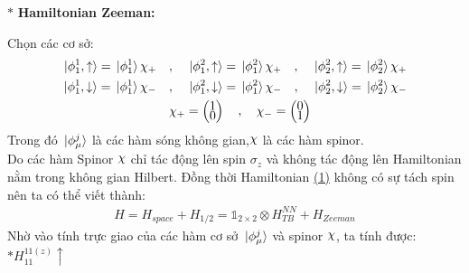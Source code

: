 \documentclass{report}
\DeclareRobustCommand{\rchi}{{\mathpalette\irchi\relax}}
\newcommand{\irchi}[2]{\raisebox{\depth}{$#1\chi$}}
\begin{document}
\clearpage

\noindent $\ast$ \textbf{Hamiltonian Zeeman:}

Chọn các cơ sở:
\begin{align*}
	\ket*{\phi^1_1 ,\uparrow}    = \ket*{\phi^1_1}\chi_{+}\quad & ,\quad \ket*{\phi^2_1 ,\uparrow} = \ket*{\phi^2_1}\chi_+ \quad,\quad \ket*{\phi^2_2 ,\uparrow} = \ket*{\phi^2_2}\chi_+         \\
	\ket*{\phi^1_1 ,\downarrow}  =	\ket*{\phi^1_1 }\chi_- \quad  & , \quad 	\ket*{\phi^2_1 ,\downarrow} = \ket*{\phi^2_1 }\chi_- \quad, \quad \ket*{\phi^2_2 ,\downarrow} = \ket*{\phi^2_2 }\chi_- \\
	                                                            & \chi_{+} = \begin{pmatrix}
		                                                                         \renewcommand{\arraystretch}{0.4}
		                                                                         1 \\
		                                                                         0
	                                                                         \end{pmatrix} \quad,\quad
	\chi_{-} = \begin{pmatrix}
		           \renewcommand{\arraystretch}{0.4}
		           0 \\
		           1
	           \end{pmatrix}
\end{align*}
Trong đó $\ket*{\phi_\mu^j}$ là các hàm sóng không gian,$\rchi$ là các hàm spinor. \\
Do các hàm Spinor $\rchi$ chỉ tác động lên spin $\sigma_z$ và không tác động lên Hamiltonian nằm trong không gian Hilbert. Đồng thời Hamiltonian \hyperref[eq:1]{(1)} không có sự tách spin nên ta có thể viết thành:
\begin{align}
	H = H_{space} + H_{1/2} = \mathbb{1}_{2\times2} \otimes H_{TB}^{NN} + H_{Zeeman}
\end{align}
Nhờ vào tính trực giao của các hàm cơ sở $\ket*{\phi_\mu^j}$ và spinor $\rchi$, ta tính được:\\
$\ast 	H_{11}^{11(z)} \uparrow$
\end{document}
